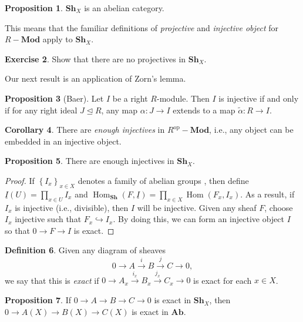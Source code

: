 \documentclass[10pt,letterpaper,cm]{nupset}
\theoremstyle{definition}
\newtheorem{definition}{Definition}[subsection]
\theoremstyle{theorem}
\newtheorem{prop}[definition]{Proposition}
\newtheorem{corollary}[definition]{Corollary}
\newtheorem{exercise}[definition]{Exercise}
\theoremstyle{remark}
\newcommand{\1}{\mathbb{1}}
\newcommand{\0}{\vec 0}
\DeclareMathOperator{\Hom}{Hom}
\DeclareMathOperator{\op}{op}
\begin{document}
\begin{prop}
$\mathbf{Sh}_{X}$ is an abelian category. 
\end{prop}

This means that the familiar definitions of \textit{projective} and \textit{injective object} for $R{-}\mathbf{Mod}$ apply to $\mathbf{Sh}_{X}$.

\begin{exercise}
Show that there are no projectives in $\mathbf{Sh}_{X}$.
\end{exercise}

\smallskip

Our next result is an application of Zorn's lemma.

\begin{prop}[Baer]
Let $I$ be a right $R$-module. Then $I$ is injective if and only if for any right ideal $J \unlhd R$, any map $\alpha : J \to I$ extends to a map $\tilde{\alpha} : R \to I$.
\end{prop}

\begin{corollary}
There are \textit{enough injectives} in $R^{\op}{-}\mathbf{Mod}$, i.e., any object can be embedded in an injective object. 
\end{corollary}

\begin{prop}
There are enough injectives in $\mathbf{Sh}_{X}$. 
\end{prop}
\begin{proof}
If $\left\{I_x\right\}_{x\in X}$ denotes a family of abelian groups , then define $\underline{I}(U) = \prod_{x\in U} I_x$ and $\Hom_{\mathbf{Sh}}(F, \underline{I}) = \prod_{x\in X} \Hom(F_x, I_x)$. As a result, if $I_x$ is injective (i.e., divisible), then $I$ will be injective. Given any sheaf $F$, choose $I_x$ injective such that $F_x \hookrightarrow I_x$. By doing this, we can form an injective object $I$ so that $0 \to F \to I$ is exact. 
\end{proof}

\begin{definition}
Given any diagram of sheaves $$  0 \to A \overset{i}{\longrightarrow} B \overset{j}{\longrightarrow} C \to 0  ,$$ we say that this is \textit{exact} if $0 \to A_x  \overset{i_x}{\longrightarrow}  B_x  \overset{j_x}{\longrightarrow}  C_x \to 0$ is exact for each $x\in X$. 
\end{definition}

\begin{prop}
If $0 \to A \to B \to C \to 0$ is exact in $\mathbf{Sh}_{X}$, then $0 \to A(X) \to B(X) \to C(X)$ is exact in $\mathbf{Ab}$.
\end{prop}
\end{document}
